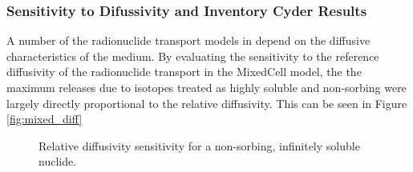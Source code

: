
\subsubsection{Sensitivity to Difussivity and Inventory Cyder Results}
A number of the radionuclide transport models in \Cyder depend on the diffusive 
characteristics of the medium. By evaluating the sensitivity to the reference 
diffusivity of the radionuclide transport in the MixedCell model, the 
the maximum releases due to isotopes treated as highly soluble and non-sorbing
were largely directly proportional to the relative diffusivity. 
This can be seen in Figure \ref{fig:mixed_diff} 
\begin{figure}[ht]
\centering
\caption{Relative diffusivity sensitivity for a non-sorbing, infinitely soluble 
nuclide.}
\label{fig:DCInvI129}
\end{figure}
